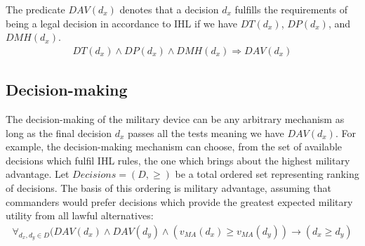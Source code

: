 \begin{ddefinition}
\label{formula:dav}
The predicate $DAV(d_x)$ denotes that a decision $d_x$ fulfills the requirements of being a legal decision in accordance to IHL if we have $DT(d_x)$, $DP(d_x)$, and $DMH(d_x)$.
\begin{align*}
DT(d_x) \wedge DP(d_x) \wedge DMH(d_x) \Rightarrow DAV(d_x)
\end{align*}
\end{ddefinition}


\subsection{Decision-making}
The decision-making of the military device can be any arbitrary mechanism as long as the final decision $d_x$ passes all the tests meaning we have $DAV(d_x)$.  For example, the decision-making mechanism can choose, from the set of available decisions which fulfil IHL rules, the one which brings about the highest military advantage. 
Let $Decisions = (D, \geq)$ be a total ordered set representing ranking of decisions. The basis of this ordering is military advantage, assuming that commanders would prefer decisions which provide the greatest expected military utility from all lawful alternatives:
\begin{align}
\label{formula:decision}
    \forall_{d_x, d_y \in D}(DAV(d_x) \wedge DAV(d_y) \wedge (v_{MA}(d_x) \geq v_{MA}(d_y)) \rightarrow (d_x \geq d_y)
\end{align}

